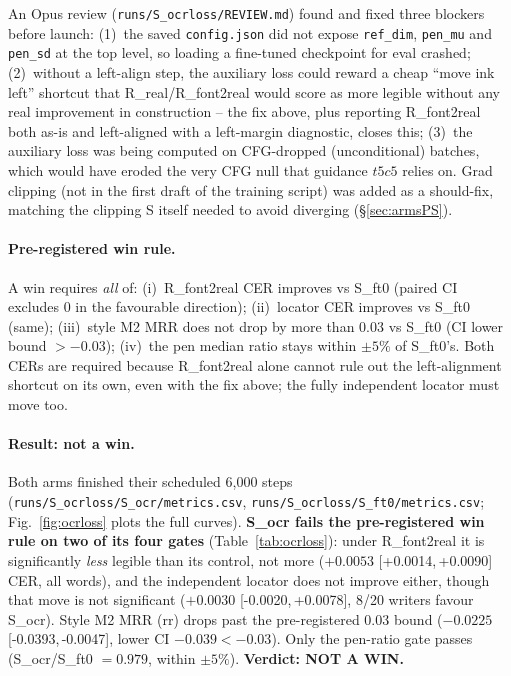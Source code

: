 \documentclass[10.5pt,a4paper]{article}
\newcommand{\fp}[1]{\nolinkurl{#1}}
\newcommand{\ci}[2]{{\footnotesize[#1,\,#2]}}
\begin{document}
\begin{sloppypar}
An Opus review (\fp{runs/S_ocrloss/REVIEW.md}) found and fixed three blockers before launch: (1)~the saved
\texttt{config.json} did not expose \texttt{ref\_dim}, \texttt{pen\_mu} and \texttt{pen\_sd} at the top level, so loading a
fine-tuned checkpoint for eval crashed; (2)~without a left-align step, the auxiliary loss could reward a cheap ``move ink
left'' shortcut that R\_real/R\_font2real would score as more legible without any real improvement in construction -- the
fix above, plus reporting R\_font2real both as-is and left-aligned with a left-margin diagnostic, closes this; (3)~the
auxiliary loss was being computed on CFG-dropped (unconditional) batches, which would have eroded the very CFG null that
guidance $t5c5$ relies on. Grad clipping (not in the first draft of the training script) was added as a should-fix, matching
the clipping S itself needed to avoid diverging (\S\ref{sec:armsPS}).
\end{sloppypar}

\paragraph{Pre-registered win rule.} A win requires \emph{all} of: (i)~R\_font2real CER improves vs S\_ft0 (paired CI
excludes 0 in the favourable direction); (ii)~locator CER improves vs S\_ft0 (same); (iii)~style M2 MRR does not drop by
more than 0.03 vs S\_ft0 (CI lower bound $>-0.03$); (iv)~the pen median ratio stays within $\pm5\%$ of S\_ft0's. Both CERs
are required because R\_font2real alone cannot rule out the left-alignment shortcut on its own, even with the fix above;
the fully independent locator must move too.

\paragraph{Result: not a win.} Both arms finished their scheduled 6,000 steps (\fp{runs/S_ocrloss/S_ocr/metrics.csv},
\fp{runs/S_ocrloss/S_ft0/metrics.csv}; Fig.~\ref{fig:ocrloss} plots the full curves). \textbf{S\_ocr fails the
pre-registered win rule on two of its four gates} (Table~\ref{tab:ocrloss}): under R\_font2real it is significantly
\emph{less} legible than its control, not more ($+0.0053$ \ci{+0.0014}{+0.0090} CER, all words), and the independent
locator does not improve either, though that move is not significant ($+0.0030$ \ci{-0.0020}{+0.0078}, 8/20 writers favour
S\_ocr). Style M2 MRR (rr) drops past the pre-registered 0.03 bound ($-0.0225$ \ci{-0.0393}{-0.0047}, lower CI
$-0.039<-0.03$). Only the pen-ratio gate passes (S\_ocr/S\_ft0 $=0.979$, within $\pm5\%$). \textbf{Verdict: NOT A WIN.}
\end{document}
